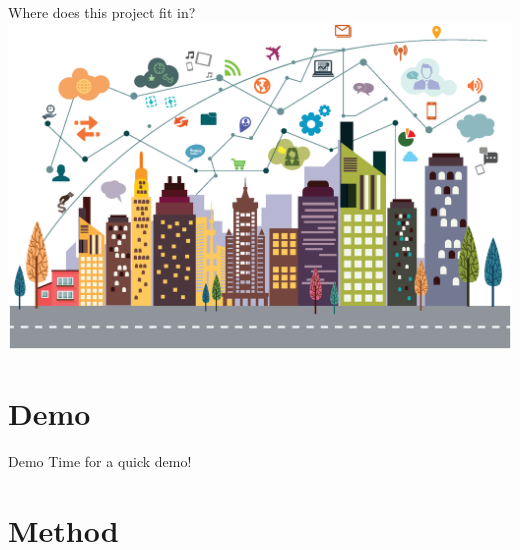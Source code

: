 \documentclass{beamer}
\begin{document}
\begin{frame}{Where does this project fit in?}
	\includegraphics[width=\linewidth]{digital.eps}
\end{frame}

\section{Demo}
\begin{frame}{Demo}
Time for a quick demo!
\end{frame}

\section{Method}
\end{document}
